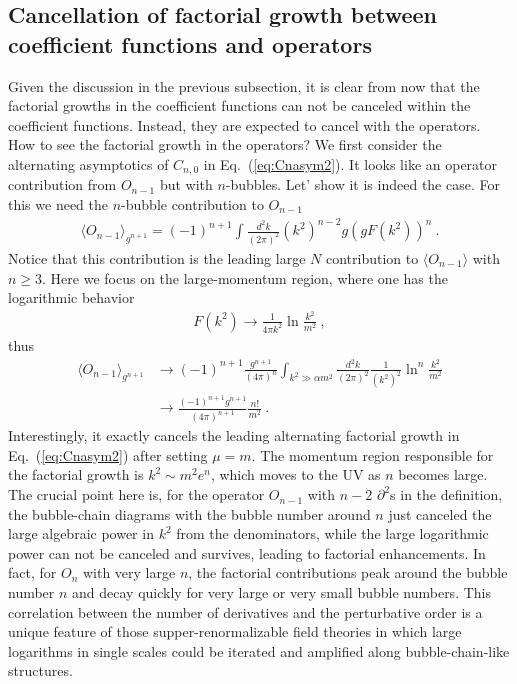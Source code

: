 \documentclass[a4paper,11pt]{article}
\begin{document}
\subsection{Cancellation of factorial growth between coefficient functions and operators}
Given the discussion in the previous subsection, it is clear from now that the factorial growths in the coefficient functions can not be canceled within the coefficient functions. Instead, they are expected to cancel with the operators. How to see the factorial growth in the operators? We first consider the alternating asymptotics of $C_{n,0}$ in Eq.~(\ref{eq:Cnasym2}). It looks like an operator contribution from $O_{n-1}$ but with $n$-bubbles. Let' show it is indeed the case. For this we need the $n$-bubble contribution to $O_{n-1}$ 
\begin{align}
\langle O_{n-1} \rangle_{g^{n+1}}=(-1)^{n+1}\int\frac{d^2k}{(2\pi)^2}(k^2)^{n-2}g(gF(k^2))^n \ .
\end{align}
Notice that this contribution is the leading large $N$ contribution to $\langle O_{n-1}\rangle$ with $n\ge 3$. Here we focus on the large-momentum region, where one has the logarithmic behavior
\begin{align}
F(k^2)\rightarrow \frac{1}{4\pi k^2}\ln\frac{k^2}{m^2} \ ,
\end{align}
thus 
\begin{align}
\langle O_{n-1} \rangle_{g^{n+1}} &\rightarrow (-1)^{n+1}\frac{g^{n+1}}{(4\pi)^{n}}\int_{k^2\gg \alpha m^2}\frac{d^2k}{(2\pi)^2}\frac{1}{(k^2)^2}\ln^{n}\frac{k^2}{m^2} \nonumber 
 \\ &\rightarrow \frac{(-1)^{n+1}g^{n+1}}{(4\pi)^{n+1}}\frac{n!}{m^2} \ . \label{eq:operatorals}
\end{align} 
Interestingly, it exactly cancels the leading alternating factorial growth in Eq.~(\ref{eq:Cnasym2}) after setting $\mu=m$. The momentum region responsible for the factorial growth is $k^2\sim m^2e^n$, which moves to the UV as $n$ becomes large. The crucial point here is, for the operator $O_{n-1}$ with $n-2$ $\partial^2$s in the definition, the bubble-chain diagrams with the bubble number around $n$ just canceled the large algebraic power in $k^2$ from the denominators, while the large logarithmic power can not be canceled and survives, leading to factorial enhancements. In fact, for $O_n$ with very large $n$, the factorial contributions peak around the bubble number $n$ and decay quickly for very large or very small bubble numbers. This correlation between the number of derivatives and the perturbative order is a unique feature of those supper-renormalizable field theories in which large logarithms in single scales could be iterated and amplified along bubble-chain-like structures. 
\end{document}
